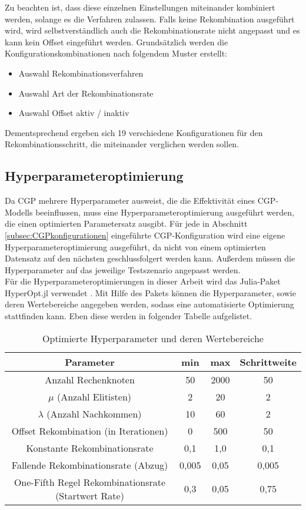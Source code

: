 Zu beachten ist, dass diese einzelnen Einstellungen miteinander kombiniert werden, solange es die Verfahren zulassen.
Falls keine Rekombination ausgeführt wird, wird selbstverständlich auch die Rekombinationsrate nicht angepasst und es kann kein Offset eingeführt werden.
Grundsätzlich werden die Konfigurationskombinationen nach folgendem Muster erstellt:
\begin{itemize}
	\item Auswahl Rekombinationsverfahren
	\item Auswahl Art der Rekombinationsrate
	\item Auswahl Offset aktiv / inaktiv
\end{itemize}

Dementsprechend ergeben sich 19 verschiedene Konfigurationen für den Rekombinationsschritt, die miteinander verglichen werden sollen. 


\subsection{Hyperparameteroptimierung}
\label{subsec:hpo}

Da CGP mehrere Hyperparameter ausweist, die die Effektivität eines CGP-Modells beeinflussen, muss eine Hyperparameteroptimierung ausgeführt werden, die einen optimierten Parametersatz ausgibt.
Für jede in Abschnitt \ref{subsec:CGPkonfigurationen} eingeführte CGP-Konfiguration wird eine eigene Hyperparameteroptimierung ausgeführt, da nicht von einem optimierten Datensatz auf den nächsten geschlussfolgert werden kann.
Außerdem müssen die Hyperparameter auf das jeweilige Testszenario angepasst werden.\\
Für die Hyperparameteroptimierungen in dieser Arbeit wird das Julia-Paket HyperOpt.jl verwendet \cite{carlson_baggepinnenhyperoptjl_2025}.
Mit Hilfe des Pakets können die Hyperparameter, sowie deren Wertebereiche angegeben werden, sodass eine automatisierte Optimierung stattfinden kann.
Eben diese werden in folgender Tabelle aufgelistet.

\begin{table}[h]
	\centering
	\begin{tabular}{c | c | c | c}
		\textbf{Parameter} & \textbf{min} & \textbf{max} & \textbf{Schrittweite}\\
		\hline
		Anzahl Rechenknoten & 50 & 2000 & 50 \\
		\hline
		$\mu$ (Anzahl Elitisten) & 2 & 20 & 2\\
		\hline
		$\lambda$ (Anzahl Nachkommen) & 10 & 60 & 2 \\
		\hline
		Offset Rekombination (in Iterationen)& 0 & 500 & 50\\
		\hline
		Konstante Rekombinationsrate & 0,1 & 1,0 & 0,1\\
		\hline
		Fallende Rekombinationsrate (Abzug) & 0,005 & 0,05 & 0,005\\
		\hline
		One-Fifth Regel Rekombinationsrate (Startwert Rate) & 0,3 & 0,05 & 0,75\\
	\end{tabular}
	\caption{Optimierte Hyperparameter und deren Wertebereiche}
	\label{table:hyperopt}
\end{table}

